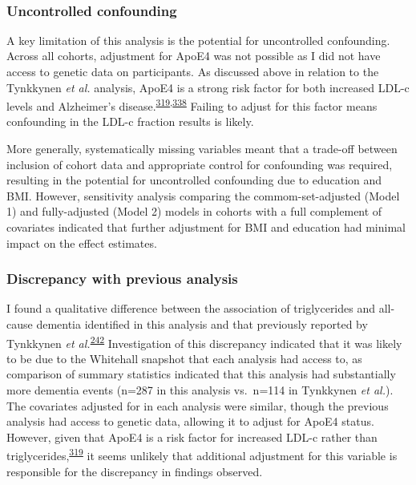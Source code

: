 \documentclass[a4paper, twoside]{templates/ociamthesis}
\begin{document}
~

\hypertarget{uncontrolled-confounding}{%
\subsubsection{Uncontrolled confounding}\label{uncontrolled-confounding}}

A key limitation of this analysis is the potential for uncontrolled confounding. Across all cohorts, adjustment for ApoE4 was not possible as I did not have access to genetic data on participants. As discussed above in relation to the Tynkkynen \emph{et al.} analysis, ApoE4 is a strong risk factor for both increased LDL-c levels and Alzheimer's disease.\textsuperscript{\protect\hyperlink{ref-bennet2007}{319},\protect\hyperlink{ref-safieh2019}{338}} Failing to adjust for this factor means confounding in the LDL-c fraction results is likely.

More generally, systematically missing variables meant that a trade-off between inclusion of cohort data and appropriate control for confounding was required, resulting in the potential for uncontrolled confounding due to education and BMI. However, sensitivity analysis comparing the commom-set-adjusted (Model 1) and fully-adjusted (Model 2) models in cohorts with a full complement of covariates indicated that further adjustment for BMI and education had minimal impact on the effect estimates.

\hypertarget{discrepancy-with-previous-analysis}{%
\subsubsection{Discrepancy with previous analysis}\label{discrepancy-with-previous-analysis}}

I found a qualitative difference between the association of triglycerides and all-cause dementia identified in this analysis and that previously reported by Tynkkynen \emph{et al.}\textsuperscript{\protect\hyperlink{ref-tynkkynen2018}{242}}
Investigation of this discrepancy indicated that it was likely to be due to the Whitehall snapshot that each analysis had access to, as comparison of summary statistics indicated that this analysis had substantially more dementia events (n=287 in this analysis vs.~n=114 in Tynkkynen \emph{et al.}). The covariates adjusted for in each analysis were similar, though the previous analysis had access to genetic data, allowing it to adjust for ApoE4 status. However, given that ApoE4 is a risk factor for increased LDL-c rather than triglycerides,\textsuperscript{\protect\hyperlink{ref-bennet2007}{319}} it seems unlikely that additional adjustment for this variable is responsible for the discrepancy in findings observed.
\end{document}
